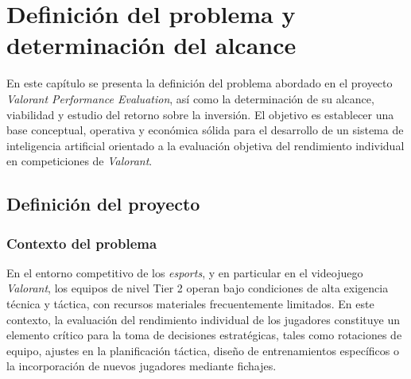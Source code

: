 \documentclass{ULBreport} %
\begin{document}

\tableofcontents
\listoftables
\listoffigures


\chapter{Definición del problema y determinación del alcance}

En este capítulo se presenta la definición del problema abordado en el proyecto \textit{Valorant Performance Evaluation}, así como la determinación de su alcance, viabilidad y estudio del retorno sobre la inversión. El objetivo es establecer una base conceptual, operativa y económica sólida para el desarrollo de un sistema de inteligencia artificial orientado a la evaluación objetiva del rendimiento individual en competiciones de \textit{Valorant}.

\section{Definición del proyecto}

\subsection{Contexto del problema}

En el entorno competitivo de los \textit{esports}, y en particular en el videojuego \textit{Valorant}, los equipos de nivel Tier 2 operan bajo condiciones de alta exigencia técnica y táctica, con recursos materiales frecuentemente limitados. En este contexto, la evaluación del rendimiento individual de los jugadores constituye un elemento crítico para la toma de decisiones estratégicas, tales como rotaciones de equipo, ajustes en la planificación táctica, diseño de entrenamientos específicos o la incorporación de nuevos jugadores mediante fichajes.
\end{document}

